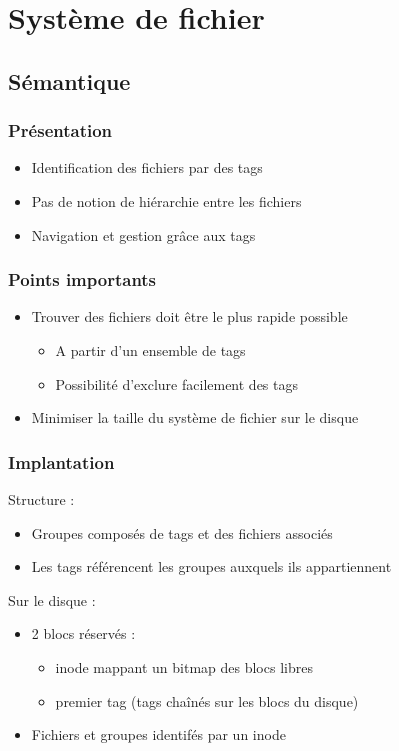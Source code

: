 \documentclass{beamer}
\begin{document}
\section{Système de fichier}
\subsection{Sémantique}
\begin{frame}
  \frametitle{Présentation}
  \begin{itemize}
  \item Identification des fichiers par des tags
  \item Pas de notion de hiérarchie entre les fichiers
  \item Navigation et gestion grâce aux tags
  \end{itemize}
\end{frame}

\begin{frame}
  \frametitle{Points importants}
  \begin{itemize}
  \item Trouver des fichiers doit être le plus rapide possible
    \begin{itemize}
      \item A partir d'un ensemble de tags
      \item Possibilité d'exclure facilement des tags
    \end{itemize}
  \item Minimiser la taille du système de fichier sur le disque
  \end{itemize}
\end{frame}

\begin{frame}
  \frametitle{Implantation}
  Structure :
  \begin{itemize}
  \item Groupes composés de tags et des fichiers associés
  \item Les tags référencent les groupes auxquels ils appartiennent
  \end{itemize}

  Sur le disque :
  \begin{itemize}
  \item 2 blocs réservés :
    \begin{itemize}
    \item inode mappant un bitmap des blocs libres
    \item premier tag (tags chaînés sur les blocs du disque)
    \end{itemize}
  \item Fichiers et groupes identifés par un inode
  \end{itemize}
\end{frame}
\end{document}
